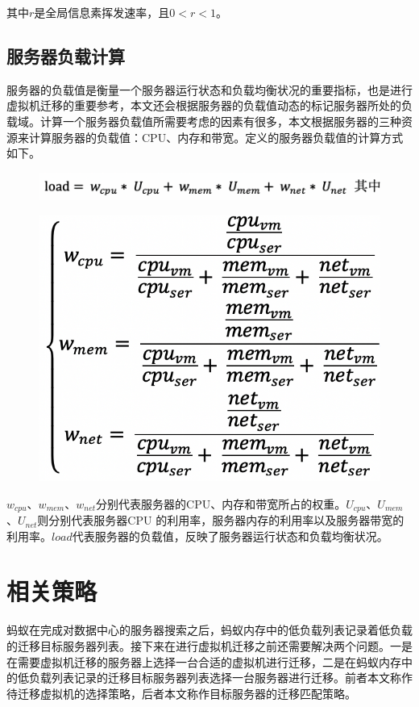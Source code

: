 其中$ r $是全局信息素挥发速率，且$ 0 < r < 1$。

\subsection{服务器负载计算}
 服务器的负载值是衡量一个服务器运行状态和负载均衡状况的重要指标，也是进行虚拟机迁移的重要参考，本文还会根据服务器的负载值动态的标记服务器所处的负载域。计算一个服务器负载值所需要考虑的因素有很多，本文根据服务器的三种资源来计算服务器的负载值：CPU、内存和带宽。定义的服务器负载值的计算方式如下。

 \begin{figure}[htb]
  \centering
  \includegraphics[width=0.65\linewidth]{./Figure/IMG_Chap3_7.png}
\end{figure}

 \begin{figure}[htb]
  \centering
  \includegraphics[width=0.5\linewidth]{./Figure/IMG_Chap3_8.png}
\end{figure}

$ w_{cpu} $、$ w_{mem} $、$ w_{net} $分别代表服务器的CPU、内存和带宽所占的权重。$ U_{cpu} $、$ U_{mem} $、$ U_{net} $则分别代表服务器CPU 的利用率，服务器内存的利用率以及服务器带宽的利用率。$ load $代表服务器的负载值，反映了服务器运行状态和负载均衡状况。

\section{相关策略}
蚂蚁在完成对数据中心的服务器搜索之后，蚂蚁内存中的低负载列表记录着低负载的迁移目标服务器列表。接下来在进行虚拟机迁移之前还需要解决两个问题。一是在需要虚拟机迁移的服务器上选择一台合适的虚拟机进行迁移，二是在蚂蚁内存中的低负载列表记录的迁移目标服务器列表选择一台服务器进行迁移。前者本文称作待迁移虚拟机的选择策略，后者本文称作目标服务器的迁移匹配策略。

